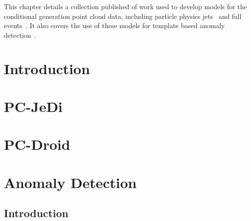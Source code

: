 This chapter details a collection published of work used to develop models for the conditional generation point cloud data, including particle physics jets~\cite{PCJedi, EpicJedi, PCDroid} and full events~\cite{PIPPIN}.
It also covers the use of these models for template based anomaly detection~\cite{Drapes}.


\section{Introduction}

\section{PC-JeDi}

\section{PC-Droid}


\section{Anomaly Detection}

\subsection{Introduction}

